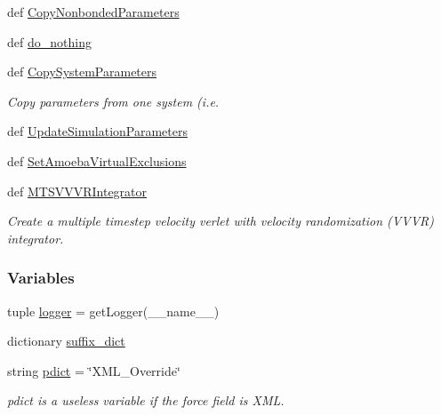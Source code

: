 \begin{DoxyCompactItemize}
\item 
def \hyperlink{namespaceforcebalance_1_1openmmio_afead47464a644d9225f9fa8eb568a8ed}{Copy\-Nonbonded\-Parameters}
\item 
def \hyperlink{namespaceforcebalance_1_1openmmio_a2bb7add6b813d94f2655372c51fe8fdc}{do\-\_\-nothing}
\item 
def \hyperlink{namespaceforcebalance_1_1openmmio_a8c6ed589ec2b35b8363a529ffdf88eb0}{Copy\-System\-Parameters}
\begin{DoxyCompactList}\small\item\em Copy parameters from one system (i.\-e. \end{DoxyCompactList}\item 
def \hyperlink{namespaceforcebalance_1_1openmmio_a9f9fc56475dbfcc94a40fef6a84ed25f}{Update\-Simulation\-Parameters}
\item 
def \hyperlink{namespaceforcebalance_1_1openmmio_a95d91538d72e354fc95433539c42450c}{Set\-Amoeba\-Virtual\-Exclusions}
\item 
def \hyperlink{namespaceforcebalance_1_1openmmio_aa085594c11e9cd00ce71f5a8ead72b68}{M\-T\-S\-V\-V\-V\-R\-Integrator}
\begin{DoxyCompactList}\small\item\em Create a multiple timestep velocity verlet with velocity randomization (V\-V\-V\-R) integrator. \end{DoxyCompactList}\end{DoxyCompactItemize}
\subsubsection*{Variables}
\begin{DoxyCompactItemize}
\item 
tuple \hyperlink{namespaceforcebalance_1_1openmmio_a1ec0ffb9266be80868bb69259349220d}{logger} = get\-Logger(\-\_\-\-\_\-name\-\_\-\-\_\-)
\item 
dictionary \hyperlink{namespaceforcebalance_1_1openmmio_aeca37c08912f1a88339680ed75839530}{suffix\-\_\-dict}
\item 
string \hyperlink{namespaceforcebalance_1_1openmmio_af225f2cfdcfd96ebd1d3175c8770a850}{pdict} = \char`\"{}X\-M\-L\-\_\-\-Override\char`\"{}
\begin{DoxyCompactList}\small\item\em pdict is a useless variable if the force field is X\-M\-L. \end{DoxyCompactList}\end{DoxyCompactItemize}



